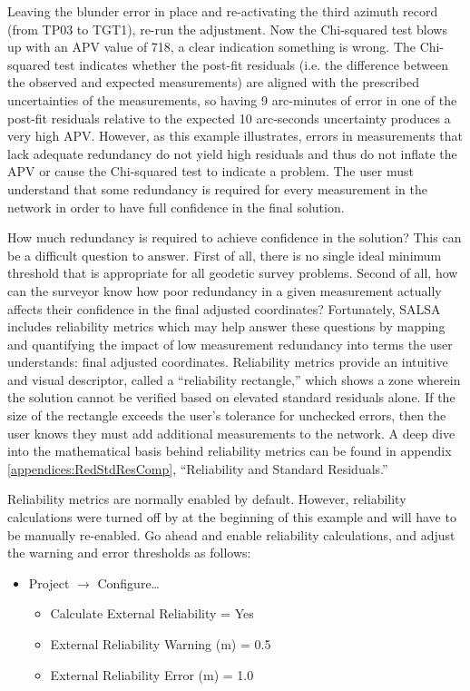 Leaving the blunder error in place and re-activating the third azimuth record (from TP03 to TGT1), re-run the adjustment. Now the Chi-squared test blows up with an APV value of 718, a clear indication something is wrong. The Chi-squared test indicates whether the post-fit residuals (i.e. the difference between the observed and expected measurements) are aligned with the prescribed uncertainties of the measurements, so having 9 arc-minutes of error in one of the post-fit residuals relative to the expected 10 arc-seconds uncertainty produces a very high APV. However, as this example illustrates, errors in measurements that lack adequate redundancy do not yield high residuals and thus do not inflate the APV or cause the Chi-squared test to indicate a problem.  The user must understand that some redundancy is required for every measurement in the network in order to have full confidence in the final solution.

How much redundancy is required to achieve confidence in the solution?  This can be a difficult question to answer.  First of all, there is no single ideal minimum threshold that is appropriate for all geodetic survey problems.  Second of all, how can the surveyor know how poor redundancy in a given measurement actually affects their confidence in the final adjusted coordinates?  Fortunately, SALSA includes reliability metrics which may help answer these questions by mapping and quantifying the impact of low measurement redundancy into terms the user understands: final adjusted coordinates. Reliability metrics provide an intuitive and visual descriptor, called a ``reliability rectangle,'' which shows a zone wherein the solution cannot be verified based on elevated standard residuals alone. If the size of the rectangle exceeds the user's tolerance for unchecked errors, then the user knows they must add additional measurements to the network.  A deep dive into the mathematical basis behind reliability metrics can be found in appendix \ref{appendices:RedStdResComp}, ``Reliability and Standard Residuals.''

Reliability metrics are normally enabled by default. However, reliability calculations were turned off by at the beginning of this example and will have to be manually re-enabled.  Go ahead and enable reliability calculations, and adjust the warning and error thresholds as follows:
\begin{itemize}
  \item Project $\to$ Configure\ldots
  \begin{itemize}
    \item Calculate External Reliability = Yes
    \item External Reliability Warning (m) = 0.5
    \item External Reliability Error (m) = 1.0
  \end{itemize}
\end{itemize}

